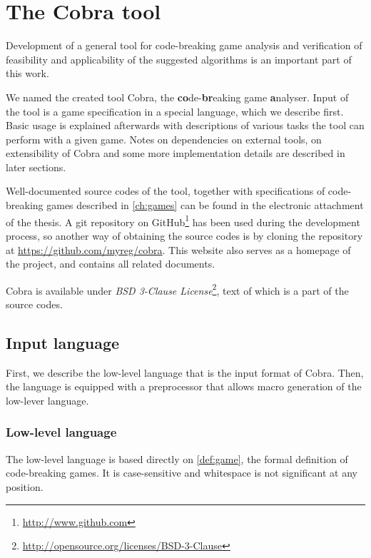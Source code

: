 \chapter{The Cobra tool}
\label{ch:cobra}

Development of a general tool for
  code-breaking game analysis
  and verification of feasibility and applicability of the suggested algorithms
  is an important part of this work.

We named the created tool Cobra, the \textbf{co}de-\textbf{br}eaking game \textbf{a}nalyser.
Input of the tool is a game specification in a special language, which
  we describe first.
Basic usage is explained afterwards with
  descriptions of various tasks the tool can perform with a given game.
Notes on dependencies on external tools,
  on extensibility of Cobra and
  some more implementation details
  are described in later sections.

Well-documented source codes of the tool, together with
  specifications of code-breaking games described in \autoref{ch:games}
  can be found in the electronic attachment of the thesis.
A git repository on GitHub\footnote{\url{http://www.github.com}}
  has been used during the development process,
  so another way of obtaining the source codes is by cloning
  the repository at \url{https://github.com/myreg/cobra}.
This website also serves as a homepage of the project, and contains
  all related documents.

Cobra is available under \emph{BSD 3-Clause License}\footnote{\url{http://opensource.org/licenses/BSD-3-Clause}},
  text of which is a part of the source codes.

\section{Input language} \label{sec:lng}

First, we describe the low-level language that is the input format of Cobra.
Then, the language is equipped with a preprocessor that allows
  macro generation of the low-lever language.

\subsection{Low-level language}

The low-level language is based directly on \autoref{def:game}, the formal definition of
  code-breaking games.
It is case-sensitive and whitespace is not significant at any position.

